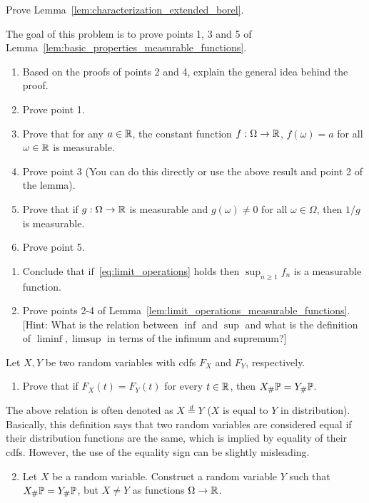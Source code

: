 \begin{problem}\label{prb:characterization_extended_borel}
Prove Lemma~\ref{lem:characterization_extended_borel}.
\end{problem}

\begin{problem}[Homework]\label{prb:basic_properties_measurable_functions}
The goal of this problem is to prove points 1, 3 and 5 of Lemma~\ref{lem:basic_properties_measurable_functions}.
\begin{enumerate}
\item Based on the proofs of points 2 and 4, explain the general idea behind the proof.
\item Prove point 1.
\item Prove that for any $a \in \mathbb R$, the constant function $f : \Omega \to \mathbb R$, $f(\omega) = a$ for all $\omega \in \mathbb R$ is measurable.
\item Prove point 3 (You can do this directly or use the above result and point 2 of the lemma).
\item Prove that if $g : \Omega \to \mathbb R$ is measurable and $g(\omega) \ne 0$ for all $\omega \in \Omega$, then $1/g$ is measurable.
\item Prove point 5.
\end{enumerate}
\end{problem}

\begin{problem}\label{prb:limit_operations_measurable_functions}
\hfil
\begin{enumerate}
\item Conclude that if~\eqref{eq:limit_operations} holds then $\sup_{n \ge 1} f_n$ is a measurable function.
\item Prove points 2-4 of Lemma~\ref{lem:limit_operations_measurable_functions}. [Hint: What is the relation between $\inf$ and $\sup$ and what is the definition of $\liminf, \limsup$ in terms of the infimum and supremum?]
\end{enumerate}
\end{problem}

\begin{problem}
Let $X,Y$ be two random variables with cdfs $F_X$ and $F_Y$, respectively. 
\begin{enumerate}
\item Prove that if $F_X(t) = F_Y(t)$ for every $t \in \mathbb R$, then $X_\# \mathbb P = Y_\# \mathbb P$. 
\end{enumerate}
The above relation is often denoted as $X \stackrel{d}{=} Y$ ($X$ is equal to $Y$ in distribution). Basically, this definition says that two random variables are considered equal if their distribution functions are the same, which is implied by equality of their cdfs. However, the use of the equality sign can be slightly misleading.
\begin{enumerate}
\setcounter{enumi}{1}
\item Let $X$ be a random variable. Construct a random variable $Y$ such that $X_\# \mathbb P = Y_\# \mathbb P$, but $X \ne Y$ as functions $\Omega \to \mathbb R$.
\end{enumerate}
\end{problem}

